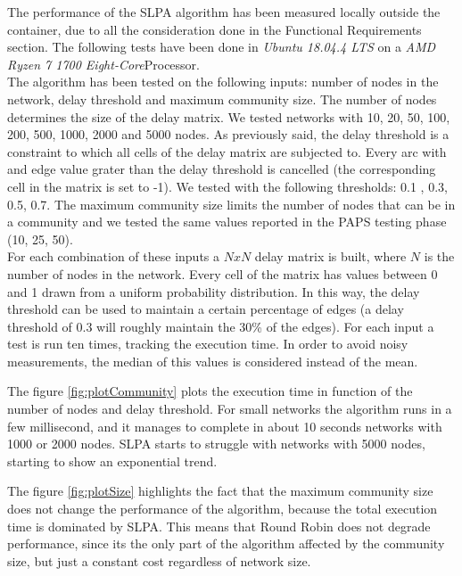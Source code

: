 The performance of the SLPA algorithm has been measured locally outside the container, due to 
all the consideration done in the Functional Requirements section.
The following tests have been done in \textit{Ubuntu 18.04.4 LTS} on a \textit{AMD Ryzen 7 1700 Eight-Core}Processor.
\\
The algorithm has been tested on the following inputs: number of nodes in the network, delay threshold and maximum community size.
The number of nodes determines the size of the delay matrix. We tested networks with 10, 20, 50, 100, 200, 500, 1000, 2000 and 5000 nodes.
As previously said, the delay threshold is a constraint to which all cells of the delay matrix are subjected to. Every arc with and edge value grater than the delay threshold
is cancelled (the corresponding cell in the matrix is set to -1). We tested with the following thresholds: 0.1 , 0.3, 0.5, 0.7.
The maximum community size limits the number of nodes that can be in a community and we tested the same values reported in the PAPS testing phase
(10, 25, 50).\\
For each combination of these inputs a $NxN$ delay matrix is built, where $N$ is the number of nodes in the network.
Every cell of the matrix has values between 0 and 1 drawn from a uniform probability distribution. In this way, the delay threshold
can be used to maintain a certain percentage of edges (a delay threshold of 0.3 will roughly maintain the 30\% of the edges).
For each input a test is run ten times, tracking the execution time. In order to avoid noisy measurements,
the median of this values is considered instead of the mean.
\par
The figure \ref{fig:plotCommunity} plots the execution time in function of the number of nodes and delay threshold.
For small networks the algorithm runs in a few millisecond, and it manages to complete in about 10 seconds networks
with 1000 or 2000 nodes. SLPA starts to struggle with networks with 5000 nodes, starting to show an exponential trend.
\par
The figure \ref{fig:plotSize} highlights the fact that the maximum community size does not change the performance 
of the algorithm, because the total execution time is dominated by SLPA. This means that Round Robin does not
degrade performance, since its the only part of the algorithm affected by the community size, but just a constant cost regardless
of network size.